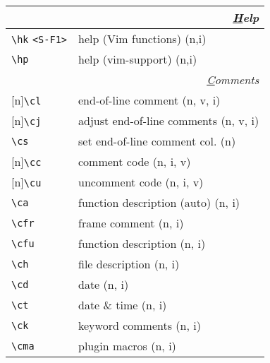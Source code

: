 \documentclass[oneside,10pt,landscape,DIV16]{scrartcl}
\newcommand{\Rep}{{\scriptsize{[n]}}}
\begin{document}
\begin{multicols}{3}
\begin{center}
\begin{tabular}[]{|p{18mm}|p{56mm}|}
\hline 
\multicolumn{2}{|r|}{\textsl{\underline{H}elp}}\\[1.0ex]
\hline \verb'\hk' \verb'<S-F1>'   & help (Vim functions) \hfill (n,i)\\
\hline \verb'\hp'                 & help (vim-support)   \hfill (n,i)\\
\hline 
\hline
\multicolumn{2}{|r|}{\textsl{\underline{C}omments}}                       \\[1.0ex]
\hline \Rep\verb'\cl'   & end-of-line comment               \hfill (n, v, i)\\
\hline \Rep\verb'\cj'   & adjust end-of-line comments       \hfill (n, v, i)\\
\hline     \verb'\cs'   & set end-of-line comment col.      \hfill (n)   \\
\hline \Rep\verb'\cc'   & comment code                      \hfill (n, i, v)\\
\hline \Rep\verb'\cu'   & uncomment code                    \hfill (n, i, v)\\
\hline     \verb'\ca'   & function description (auto)       \hfill (n, i)\\
%
\hline     \verb'\cfr'  & frame comment                     \hfill (n, i)\\
\hline     \verb'\cfu'  & function description              \hfill (n, i)\\
\hline     \verb'\ch'   & file description                  \hfill (n, i)\\
\hline     \verb'\cd'   & date                              \hfill (n, i)\\
\hline     \verb'\ct'   & date \& time                      \hfill (n, i)\\
\hline
%
\hline     \verb'\ck'   & keyword comments                  \hfill (n, i)\\
\hline     \verb'\cma'  & plugin macros                     \hfill (n, i)\\

\end{tabular}
\end{center}
\end{multicols}
\end{document}
